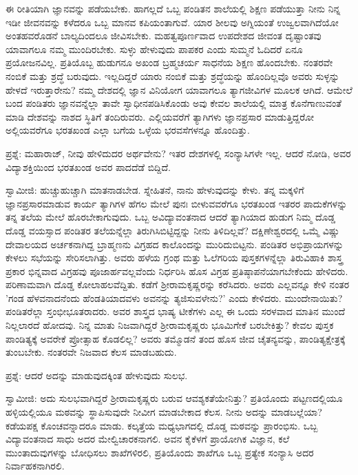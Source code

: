 ಈ ರೀತಿಯಾಗಿ ಜ್ಞಾನವನ್ನು ಪಡೆಯಬೇಕು. ಹಾಗಲ್ಲದೆ ಒಬ್ಬ ಪಂಡಿತನ ಶಾಲೆಯಲ್ಲಿ ಶಿಕ್ಷಣ ಪಡೆಯುತ್ತಾ ನೀನು ನಿನ್ನ ಇಡೀ ಜೀವನವನ್ನು ಕಳೆದರೂ ಒಬ್ಬ ಮಾನವ ಕಪಿಯಂತಾಗುವೆ. ಯಾರ ಶೀಲವು ಅಗ್ನಿಯಂತೆ ಉಜ್ವಲವಾಗಿದೆಯೋ ಅಂತಹವರೊಡನೆ ಬಾಲ್ಯದಿಂದಲೂ ಜೀವಿಸಬೇಕು. ಮಹತ್ವಪೂರ್ಣವಾದ ಉಪದೇಶದ ಜೀವಂತ ದೃಷ್ಟಾಂತವು ಯಾವಾಗಲೂ ನಮ್ಮ ಮುಂದಿರಬೇಕು. ಸುಳ್ಳು ಹೇಳುವುದು ಪಾಪಕರ ಎಂದು ಸುಮ್ಮನೆ ಓದಿದರೆ ಏನೂ ಪ್ರಯೋಜನವಿಲ್ಲ. ಪ್ರತಿಯೊಬ್ಬ ಹುಡುಗನೂ ಅಖಂಡ ಬ್ರಹ್ಮಚರ್ಯ ಸಾಧನೆಯ ಶಿಕ್ಷಣ ಹೊಂದಬೇಕು. ನಂತರವೇ ನಂಬಿಕೆ ಮತ್ತು ಶ್ರದ್ಧೆ ಬರುವುದು. ಇಲ್ಲದಿದ್ದರೆ ಯಾರು ನಂಬಿಕೆ ಮತ್ತು ಶ್ರದ್ಧೆಯನ್ನು ಹೊಂದಿಲ್ಲವೊ ಅವರು ಸುಳ್ಳನ್ನು ಹೇಳದೆ ಇರುತ್ತಾರೇನು? ನಮ್ಮ ದೇಶದಲ್ಲಿ ಜ್ಞಾನ ವಿನಿಯೋಗ ಯಾವಾಗಲೂ ತ್ಯಾಗಜೀವಿಗಳ ಮೂಲಕ ಆಗಿದೆ. ಆಮೇಲೆ ಬಂದ ಪಂಡಿತರು ಜ್ಞಾನವನ್ನೆಲ್ಲಾ ತಾವೇ ಸ್ವಾಧೀನಪಡಿಸಿಕೊಂಡು ಅವು ಕೇವಲ ಶಾಲೆಯಲ್ಲಿ ಮಾತ್ರ ಕೊನೆಗಾಣುವಂತೆ ಮಾಡಿ ದೇಶವನ್ನು ನಾಶದ ಸ್ಥಿತಿಗೆ ತಂದಿರುವರು. ಎಲ್ಲಿಯವರೆಗೆ ತ್ಯಾಗಿಗಳು ಜ್ಞಾನಪ್ರಸಾರ ಮಾಡುತ್ತಿದ್ದರೋ ಅಲ್ಲಿಯವರೆಗೂ ಭರತಖಂಡ ಎಲ್ಲಾ ಬಗೆಯ ಒಳ್ಳೆಯ ಭರವಸೆಗಳನ್ನೂ ಹೊಂದಿತ್ತು.

ಪ್ರಶ್ನೆ: ಮಹಾರಾಜ್, ನೀವು ಹೇಳಿದುದರ ಅರ್ಥವೇನು? ಇತರ ದೇಶಗಳಲ್ಲಿ ಸಂನ್ಯಾಸಿಗಳೇ ಇಲ್ಲ. ಆದರೆ ನೋಡಿ, ಅವರ ವಿದ್ಯಾಶಕ್ತಿಯಿಂದ ಭರತಖಂಡ ಅವರ ಪಾದದೆಡೆ ಬಿದ್ದಿದೆ.

ಸ್ವಾಮೀಜಿ: ಹುಚ್ಚುಹುಚ್ಚಾಗಿ ಮಾತನಾಡಬೇಡ. ಸ್ನೇಹಿತನೆ, ನಾನು ಹೇಳುವುದನ್ನು ಕೇಳು. ತನ್ನ ಮಕ್ಕಳಿಗೆ ಜ್ಞಾನಪ್ರಸಾರಮಾಡುವ ಕಾರ್ಯ ತ್ಯಾಗಿಗಳ ಹೆಗಲ ಮೇಲೆ ಪುನಃ ಬೀಳುವವರೆಗೂ ಭರತಖಂಡ ಇತರರ ಪಾದುಕೆಗಳನ್ನು ತನ್ನ ತಲೆಯ ಮೇಲೆ ಹೊರಬೇಕಾಗುವುದು. ಒಬ್ಬ ಅವಿದ್ಯಾವಂತನಾದ ಆದರೆ ತ್ಯಾಗಿಯಾದ ಹುಡುಗ ನಿಮ್ಮ ದೊಡ್ಡ ದೊಡ್ಡ ವಯಸ್ಸಾದ ಪಂಡಿತರ ತಲೆಯನ್ನೆಲ್ಲಾ ತಿರುಗಿಸಿಬಿಟ್ಟಿದ್ದನ್ನು ನೀನು ತಿಳಿದಿಲ್ಲವೆ? ದಕ್ಷಿಣೇಶ್ವರದಲ್ಲಿ ಒಮ್ಮೆ ವಿಷ್ಣು ದೇವಾಲಯದ ಅರ್ಚಕನಾಗಿದ್ದ ಬ್ರಾಹ್ಮಣನು ವಿಗ್ರಹದ ಕಾಲೊಂದನ್ನು ಮುರಿದುಬಿಟ್ಟನು. ಪಂಡಿತರ ಅಭಿಪ್ರಾಯಗಳನ್ನು ಕೇಳಲು ಸಭೆಯನ್ನು ಸೇರಿಸಲಾಗಿತ್ತು. ಅವರು ಹಳೆಯ ಗ್ರಂಥ ಮತ್ತು ಓಲೆಗರಿಯ ಪುಸ್ತಕಗಳನ್ನೆಲ್ಲಾ ತಿರುವಿಹಾಕಿ ಶಾಸ್ತ್ರ ಪ್ರಕಾರ ಭಿನ್ನವಾದ ವಿಗ್ರಹವು ಪೂಜಾರ್ಹವಲ್ಲವೆಂದು ನಿರ್ಧರಿಸಿ ಹೊಸ ವಿಗ್ರಹ ಪ್ರತಿಷ್ಠಾಪನೆಯಾಗಬೇಕೆಂದು ಹೇಳಿದರು. ಪರಿಣಾಮವಾಗಿ ದೊಡ್ಡ ಕೋಲಾಹಲವೆದ್ದಿತು. ಕಡೆಗೆ ಶ‍್ರೀರಾಮಕೃಷ್ಣರನ್ನು ಕರೆಸಿದರು. ಅವರು ಎಲ್ಲವನ್ನೂ ಕೇಳಿ ನಂತರ 'ಗಂಡ ಹೆಳವನಾದನೆಂದು ಹೆಂಡತಿಯಾದವಳು ಅವನನ್ನು ತ್ಯಜಿಸುವಳೇನು?' ಎಂದು ಕೇಳಿದರು. ಮುಂದೇನಾಯಿತು? ಪಂಡಿತರೆಲ್ಲಾ ಸ್ತಂಭೀಭೂತರಾದರು. ಅವರ ಶಾಸ್ತ್ರದ ಭಾಷ್ಯ ಟೀಕೆಗಳು ಎಲ್ಲ ಈ ಒಂದು ಸರಳವಾದ ಮಾತಿನ ಮುಂದೆ ನಿಲ್ಲಲಾರದೆ ಹೋದವು. ನಿನ್ನ ಮಾತು ನಿಜವಾಗಿದ್ದರೆ ಶ‍್ರೀರಾಮಕೃಷ್ಣರು ಭೂಮಿಗೇಕೆ ಬರಬೇಕಿತ್ತು? ಕೇವಲ ಪುಸ್ತಕ ಪಾಂಡಿತ್ಯಕ್ಕೆ ಅವರೇಕೆ ಪ್ರೋತ್ಸಾಹ ಕೊಡಲಿಲ್ಲ? ಅವರು ತಮ್ಮೊಡನೆ ತಂದ ಹೊಸ ಜೀವ ಚೈತನ್ಯವನ್ನು, ಪಾಂಡಿತ್ಯಕ್ಷೇತ್ರಕ್ಕೆ ತುಂಬಬೇಕು. ನಂತರವೇ ನಿಜವಾದ ಕೆಲಸ ಮಾಡಬಹುದು.

ಪ್ರಶ್ನೆ: ಆದರೆ ಅದನ್ನು ಮಾಡುವುದಕ್ಕಿಂತ ಹೇಳುವುದು ಸುಲಭ.

ಸ್ವಾಮೀಜಿ: ಅದು ಸುಲಭವಾಗಿದ್ದರೆ ಶ‍್ರೀರಾಮಕೃಷ್ಣರು ಬರುವ ಆವಶ್ಯಕತೆಯೇನಿತ್ತು? ಪ್ರತಿಯೊಂದು ಪಟ್ಟಣದಲ್ಲಿಯೂ ಹಳ್ಳಿಯಲ್ಲಿಯೂ ಮಠವನ್ನು ಸ್ಥಾಪಿಸುವುದೇ ನೀವೀಗ ಮಾಡಬೇಕಾದ ಕೆಲಸ. ನೀನು ಅದನ್ನು ಮಾಡಬಲ್ಲೆಯಾ? ಕಡೆಯಪಕ್ಷ ಕೊಂಚವನ್ನಾದರೂ ಮಾಡು. ಕಲ್ಕತ್ತೆಯ ಮಧ್ಯಭಾಗದಲ್ಲಿ ದೊಡ್ಡ ಮಠವನ್ನು ಪ್ರಾರಂಭಿಸು. ಒಬ್ಬ ವಿದ್ಯಾವಂತನಾದ ಸಾಧು ಅದರ ಮೇಲ್ವಿಚಾರಕನಾಗಲಿ. ಅವನ ಕೈಕೆಳಗೆ ಪ್ರಾಯೋಗಿಕ ವಿಜ್ಞಾನ, ಕಲೆ ಮುಂತಾದುವುಗಳನ್ನು ಬೋಧಿಸಲು ಶಾಖೆಗಳಿರಲಿ, ಪ್ರತಿಯೊಂದು ಶಾಖೆಗೂ ಒಬ್ಬ ಪ್ರತ್ಯೇಕ ಸಂನ್ಯಾಸಿ ಅದರ ನಿರ್ವಾಹಕನಾಗಿರಲಿ.

